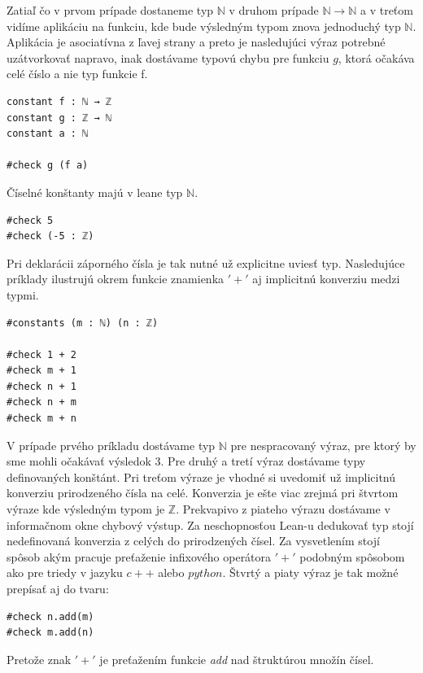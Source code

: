 \documentclass[a4paper,10pt,oneside]{report}%
\begin{document}
    Zatiaľ čo v prvom prípade dostaneme typ $\mathbb{N}$ v druhom prípade
$\mathbb{N} \to \mathbb{N}$ a v treťom vidíme aplikáciu na funkciu, kde bude výsledným
typom znova jednoduchý typ $\mathbb{N}$.
    Aplikácia je asociatívna z ľavej strany a  preto je nasledujúci výraz potrebné 
uzátvorkovať napravo, inak dostávame typovú chybu pre funkciu $g$, ktorá očakáva 
celé číslo a nie typ funkcie f.
\begin{lstlisting}
constant f : ℕ → ℤ
constant g : ℤ → ℕ
constant a : ℕ

#check g (f a)
\end{lstlisting}
    Číselné konštanty majú v leane typ $\mathbb{N}$.
\begin{lstlisting}
#check 5
#check (-5 : ℤ)
\end{lstlisting}
    Pri deklarácii záporného čísla je tak nutné už explicitne uviesť typ.
Nasledujúce príklady ilustrujú okrem funkcie znamienka $'+'$ aj implicitnú konverziu medzi typmi.
\begin{lstlisting}
#constants (m : ℕ) (n : ℤ)

#check 1 + 2
#check m + 1
#check n + 1
#check n + m
#check m + n
\end{lstlisting}
    V prípade prvého príkladu dostávame typ $\mathbb{N}$ pre nespracovaný výraz, 
pre ktorý by sme mohli očakávať výsledok $3$.
    Pre druhý a tretí výraz dostávame typy definovaných konštánt.
    Pri treťom výraze je vhodné si uvedomiť už implicitnú konverziu prirodzeného
čísla na celé.
    Konverzia je ešte viac zrejmá pri štvrtom výraze kde výsledným typom je
$\mathbb{Z}$.
    Prekvapivo z piateho výrazu dostávame v informačnom okne chybový výstup.
    Za neschopnosťou Lean-u dedukovať typ stojí nedefinovaná konverzia z celých 
do prirodzených čísel.
    Za vysvetlením stojí spôsob akým pracuje preťaženie infixového operátora $'+'$
podobným spôsobom ako pre triedy v jazyku $c++$ alebo $python$. Štvrtý a piaty
výraz je tak možné prepísať aj do tvaru:
\begin{lstlisting}
#check n.add(m)
#check m.add(n)
\end{lstlisting}
    Pretože znak $'+'$ je preťažením funkcie \emph{add} nad štruktúrou množín čísel.
\end{document}

